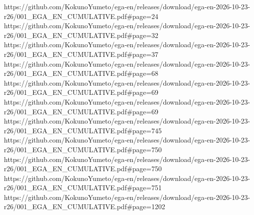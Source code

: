 \makeatletter
\expandafter\def\csname EGAIVThreeExternal@0.2.1.8\endcsname{https://github.com/KokunoYumeto/ega-en/releases/download/ega-en-2026-10-23-r26/001_EGA_EN_CUMULATIVE.pdf\#page=24}
\expandafter\def\csname EGAIVThreeExternal@0.3.7.1\endcsname{https://github.com/KokunoYumeto/ega-en/releases/download/ega-en-2026-10-23-r26/001_EGA_EN_CUMULATIVE.pdf\#page=32}
\expandafter\def\csname EGAIVThreeExternal@0.4.3.1\endcsname{https://github.com/KokunoYumeto/ega-en/releases/download/ega-en-2026-10-23-r26/001_EGA_EN_CUMULATIVE.pdf\#page=37}
\expandafter\def\csname EGAIVThreeExternal@0.8.2.5\endcsname{https://github.com/KokunoYumeto/ega-en/releases/download/ega-en-2026-10-23-r26/001_EGA_EN_CUMULATIVE.pdf\#page=68}
\expandafter\def\csname EGAIVThreeExternal@0.9.1.1\endcsname{https://github.com/KokunoYumeto/ega-en/releases/download/ega-en-2026-10-23-r26/001_EGA_EN_CUMULATIVE.pdf\#page=69}
\expandafter\def\csname EGAIVThreeExternal@0.9.1.3\endcsname{https://github.com/KokunoYumeto/ega-en/releases/download/ega-en-2026-10-23-r26/001_EGA_EN_CUMULATIVE.pdf\#page=69}
\expandafter\def\csname EGAIVThreeExternal@IV.1.4.6\endcsname{https://github.com/KokunoYumeto/ega-en/releases/download/ega-en-2026-10-23-r26/001_EGA_EN_CUMULATIVE.pdf\#page=745}
\expandafter\def\csname EGAIVThreeExternal@IV.1.8.4\endcsname{https://github.com/KokunoYumeto/ega-en/releases/download/ega-en-2026-10-23-r26/001_EGA_EN_CUMULATIVE.pdf\#page=750}
\expandafter\def\csname EGAIVThreeExternal@IV.1.8.4.2\endcsname{https://github.com/KokunoYumeto/ega-en/releases/download/ega-en-2026-10-23-r26/001_EGA_EN_CUMULATIVE.pdf\#page=750}
\expandafter\def\csname EGAIVThreeExternal@IV.1.8.6\endcsname{https://github.com/KokunoYumeto/ega-en/releases/download/ega-en-2026-10-23-r26/001_EGA_EN_CUMULATIVE.pdf\#page=751}
\expandafter\def\csname EGAIVThreeExternal@IV.17.9.6\endcsname{https://github.com/KokunoYumeto/ega-en/releases/download/ega-en-2026-10-23-r26/001_EGA_EN_CUMULATIVE.pdf\#page=1202}
\let\EGAIVThreeOriginalStableOrOriginalLink\sgaStableOrOriginalLink
\renewcommand{\sgaStableOrOriginalLink}[2]{%
  \ifcsname EGAIVThreeExternal@#1\endcsname
    \href{\csname EGAIVThreeExternal@#1\endcsname}{#2}%
  \else
    \EGAIVThreeOriginalStableOrOriginalLink{#1}{#2}%
  \fi
}
\makeatother
